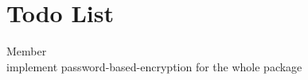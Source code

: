 \chapter{Todo List}
\hypertarget{todo}{}\label{todo}

\begin{DoxyRefList}
\item[Member \doxylink{pkcs12_8js_a9dec7a67109e50c90e06d3d1f29b4db7}{to\+Pkcs12\+Asn1} ]\hfill \\
\label{todo__todo000001}%
%
implement password-\/based-\/encryption for the whole package
\end{DoxyRefList}